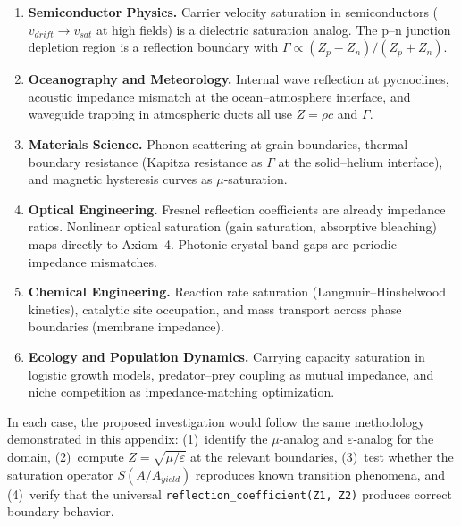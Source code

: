 \begin{enumerate}
\item \textbf{Semiconductor Physics.}
Carrier velocity saturation in semiconductors ($v_{drift} \to v_{sat}$
at high fields) is a dielectric saturation analog.  The p--n
junction depletion region is a reflection boundary with
$\Gamma \propto (Z_p - Z_n)/(Z_p + Z_n)$.

\item \textbf{Oceanography and Meteorology.}
Internal wave reflection at pycnoclines, acoustic impedance mismatch
at the ocean--atmosphere interface, and waveguide trapping in
atmospheric ducts all use $Z = \rho c$ and $\Gamma$.

\item \textbf{Materials Science.}
Phonon scattering at grain boundaries, thermal boundary resistance
(Kapitza resistance as $\Gamma$ at the solid--helium interface),
and magnetic hysteresis curves as $\mu$-saturation.

\item \textbf{Optical Engineering.}
Fresnel reflection coefficients are already impedance ratios.
Nonlinear optical saturation (gain saturation, absorptive bleaching)
maps directly to Axiom~4.  Photonic crystal band gaps are periodic
impedance mismatches.

\item \textbf{Chemical Engineering.}
Reaction rate saturation (Langmuir--Hinshelwood kinetics), catalytic
site occupation, and mass transport across phase boundaries
(membrane impedance).

\item \textbf{Ecology and Population Dynamics.}
Carrying capacity saturation in logistic growth models, predator--prey
coupling as mutual impedance, and niche competition as
impedance-matching optimization.

\end{enumerate}

\medskip
\noindent
In each case, the proposed investigation would follow the same
methodology demonstrated in this appendix: (1)~identify the
$\mu$-analog and $\varepsilon$-analog for the domain, (2)~compute
$Z = \sqrt{\mu/\varepsilon}$ at the relevant boundaries, (3)~test
whether the saturation operator $S(A/A_{yield})$ reproduces known
transition phenomena, and (4)~verify that the universal
\texttt{reflection\_coefficient(Z1, Z2)} produces correct boundary
behavior.

